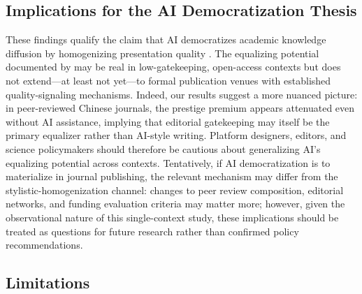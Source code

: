 \documentclass[12pt,a4paper]{article}
\begin{document}
\subsection{Implications for the AI Democratization Thesis}

These findings qualify the claim that AI democratizes academic
knowledge diffusion by homogenizing presentation quality
\citep{Huang2021,Liang2024}.
The equalizing potential documented by \citet{JoLi2026} may be
real in low-gatekeeping, open-access contexts but does not extend---at
least not yet---to formal publication venues with established
quality-signaling mechanisms.
Indeed, our results suggest a more nuanced picture: in peer-reviewed
Chinese journals, the prestige premium appears attenuated even without
AI assistance, implying that editorial gatekeeping may itself be the
primary equalizer rather than AI-style writing.
Platform designers, editors, and science policymakers should therefore
be cautious about generalizing AI's equalizing potential across
contexts.
Tentatively, if AI democratization is to materialize in journal publishing,
the relevant mechanism may differ from the stylistic-homogenization
channel: changes to peer review composition, editorial networks, and
funding evaluation criteria may matter more; however, given the
observational nature of this single-context study, these implications
should be treated as questions for future research rather than
confirmed policy recommendations.

\subsection{Limitations}
\end{document}
